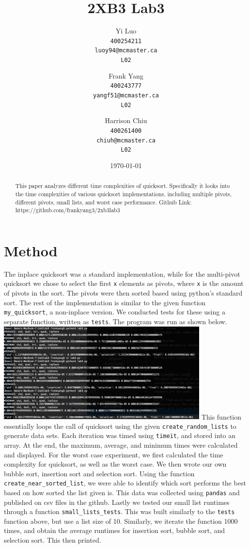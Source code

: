 \documentclass{article}
\title{2XB3 Lab3}
\author{
  Yi Luo\\
  \texttt{400254211}\\
  \texttt{luoy94@mcmaster.ca}\\
  \texttt{L02}
  \and
  Frank Yang\\
  \texttt{400243777}\\
  \texttt{yangf51@mcmaster.ca}\\
  \texttt{L02}
  \and
  Harrison Chiu\\
  \texttt{400261400}\\
  \texttt{chiuh@mcmaster.ca}\\
  \texttt{L02}
}
\date{\today}
\begin{document}
\maketitle

\begin{abstract}
This paper analyzes different time complexities of quicksort. Specifically it looks into the time complexities of various quicksort implementations, including multiple pivots, different pivots, small lists, and worst case performance. Github Link: https://github.com/frankyang3/2xb3lab3
\end{abstract}

\pagebreak 
\section*{Method}
 The inplace quicksort was a standard implementation, while for the multi-pivot quicksort we chose to select the first \verb|x| elements as pivots, where \verb|x| is the amount of pivots in the sort. The pivots were then sorted based using python's standard sort. The rest of the implementation is similar to the given function \verb|my_quicksort|, a non-inplace version. We conducted tests for these using a separate function, written as \verb|tests|. The program was run as shown below.
 \break
 \includegraphics[width=0.8\textwidth]{Lab3Method}
 \break This function essentially loops the call of quicksort using the given \verb|create_random_lists| to generate data sets. Each iteration was timed using \verb|timeit|, and stored into an array. At the end, the maximum, average, and minimum times were calculated and displayed. For the worst case experiment, we first calculated the time complexity for quicksort, as well as the worst case. We then wrote our own bubble sort, insertion sort and selection sort. Using the function \verb|create_near_sorted_list|, we were able to identify which sort performs the best based on how sorted the list given is. This data was collected using \verb|pandas| and published on csv files in the github. Lastly we tested our small list runtimes through a function \verb|small_lists_tests|. This was built similarly to the \verb|tests| function above, but use a list size of 10. Similarly, we iterate the function 1000 times, and obtain the average runtimes for insertion sort, bubble sort, and selection sort. This then printed.
\end{document}
